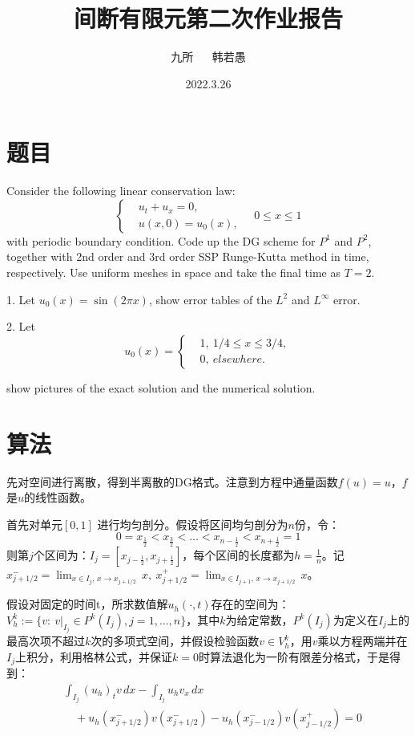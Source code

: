 \documentclass[12pt, a4paper]{ctexart}
\title{间断有限元第二次作业报告}
\author{九所 $\quad$ 韩若愚}
\date{2022.3.26}
\begin{document}
	\maketitle
	
	\section{题目}
	
	Consider the following linear conservation law:
	\begin{equation}
	\begin{cases}
	&u_t + u_x = 0,\\
	&u(x,0) = u_0(x),
	\end{cases}
	\quad 0 \leq x \leq 1
	\end{equation}
	with periodic boundary condition. Code up the DG scheme for $P^1$ and $ P^2$, together with 2nd order and 3rd order SSP Runge-Kutta method in time, respectively. Use uniform meshes in space and take the final time as $T=2$.
	
	1. Let $u_0(x) = \sin (2 \pi x)$, show error tables of the $L^2$ and $L^\infty$ error.
	
	2. Let
	\begin{equation}
	u_0(x) = 
	\begin{cases}
	&1, \  1/4 \leq x \leq 3/4,\\
	&0, \  elsewhere.
	\end{cases}
	\end{equation}
	
	show pictures of the exact solution and the numerical solution.
	
	\section{算法}
	先对空间进行离散，得到半离散的DG格式。注意到方程中通量函数$f(u) = u$，$f$是$u$的线性函数。
	
	首先对单元$[0,1]$ 进行均匀剖分。假设将区间均匀剖分为$n$份，令：
	\begin{equation}
	0 = x_{\frac{1}{2}} < x_{\frac{3}{2}} < \dots < x_{n-\frac{1}{2}} < x_{n+\frac{1}{2}} = 1
	\end{equation}
	则第$j$个区间为：$ I_j = [x_{j- \frac{1}{2}}, x_{j + \frac{1}{2}}]$，每个区间的长度都为$h = \frac{1}{n}$。记$x_{j+1/2}^- = \lim_{x \in I_j, \, x \to x_{j+1/2}} \, x, \  x_{j+1/2}^+ = \lim_{x \in I_{j+1}, \, x \to x_{j+1/2}} \, x$。
	
	假设对固定的时间t，所求数值解$u_h(\cdot,t)$存在的空间为：$ V_h^k := \{ v : \  v|_{I_j} \in P^k(I_j), j = 1, \dots, n \}$，其中$k$为给定常数，$P^k(I_j)$为定义在$I_j$上的最高次项不超过$k$次的多项式空间，并假设检验函数$v \in V_h^k$，用$v$乘以方程两端并在$I_j$上积分，利用格林公式，并保证$k=0$时算法退化为一阶有限差分格式，于是得到：
	\begin{equation}
	\begin{split}
	&\int_{I_j} (u_h)_t v \, dx - \int_{I_j} u_h v_x \, dx\\
	& \quad + u_h(x_{j+1/2}^-) v(x_{j+1/2}^-) - u_h(x_{j-1/2}^-) v(x_{j-1/2}^+) = 0
	\end{split}
	\label{1}
	\end{equation}
	
\end{document}
